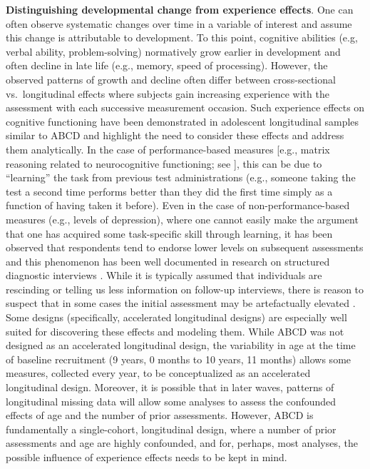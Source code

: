 \documentclass[
  10pt,
  letterpaper,
]{article}
\begin{document}
\textbf{Distinguishing developmental change from experience effects}.
One can often observe systematic changes over time in a variable of
interest and assume this change is attributable to development. To this
point, cognitive abilities (e.g, verbal ability, problem-solving)
normatively grow earlier in development and often decline in late life
(e.g., memory, speed of processing). However, the observed patterns of
growth and decline often differ between cross-sectional vs.~longitudinal
effects \citep{salthouse2014} where subjects gain increasing experience
with the assessment with each successive measurement occasion. Such
experience effects on cognitive functioning have been demonstrated in
adolescent longitudinal samples similar to ABCD \citep{sullivan2017} and
highlight the need to consider these effects and address them
analytically. In the case of performance-based measures {[}e.g., matrix
reasoning related to neurocognitive functioning; see
\citet{salthouse2014}{]}, this can be due to ``learning'' the task from
previous test administrations (e.g., someone taking the test a second
time performs better than they did the first time simply as a function
of having taken it before). Even in the case of non-performance-based
measures (e.g., levels of depression), where one cannot easily make the
argument that one has acquired some task-specific skill through
learning, it has been observed that respondents tend to endorse lower
levels on subsequent assessments
\citetext{\citealp[e.g.,][]{beck1961}; \citealp[see][]{french2010}} and
this phenomenon has been well documented in research on structured
diagnostic interviews \citep{robins1985}. While it is typically assumed
that individuals are rescinding or telling us less information on
follow-up interviews, there is reason to suspect that in some cases the
initial assessment may be artefactually elevated
\citep[see][]{shrout2018a}. Some designs (specifically, accelerated
longitudinal designs) are especially well suited for discovering these
effects and modeling them. While ABCD was not designed as an accelerated
longitudinal design, the variability in age at the time of baseline
recruitment (9 years, 0 months to 10 years, 11 months) allows some
measures, collected every year, to be conceptualized as an accelerated
longitudinal design. Moreover, it is possible that in later waves,
patterns of longitudinal missing data will allow some analyses to assess
the confounded effects of age and the number of prior assessments.
However, ABCD is fundamentally a single-cohort, longitudinal design,
where a number of prior assessments and age are highly confounded, and
for, perhaps, most analyses, the possible influence of experience
effects needs to be kept in mind.
\end{document}
